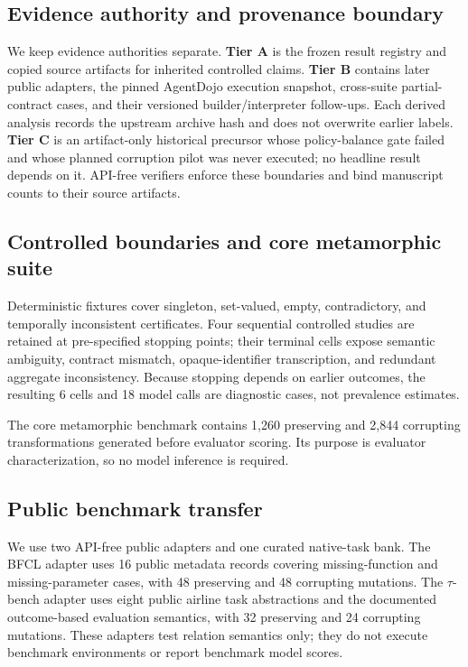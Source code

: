 \subsection{Evidence authority and provenance boundary}
We keep evidence authorities separate. \textbf{Tier A} is the frozen result registry and copied source artifacts for inherited controlled claims. \textbf{Tier B} contains later public adapters, the pinned AgentDojo execution snapshot, cross-suite partial-contract cases, and their versioned builder/interpreter follow-ups. Each derived analysis records the upstream archive hash and does not overwrite earlier labels. \textbf{Tier C} is an artifact-only historical precursor whose policy-balance gate failed and whose planned corruption pilot was never executed; no headline result depends on it. API-free verifiers enforce these boundaries and bind manuscript counts to their source artifacts.

\subsection{Controlled boundaries and core metamorphic suite}
Deterministic fixtures cover singleton, set-valued, empty, contradictory, and temporally inconsistent certificates. Four sequential controlled studies are retained at pre-specified stopping points; their terminal cells expose semantic ambiguity, contract mismatch, opaque-identifier transcription, and redundant aggregate inconsistency. Because stopping depends on earlier outcomes, the resulting 6 cells and 18 model calls are diagnostic cases, not prevalence estimates.

The core metamorphic benchmark contains 1,260 preserving and 2,844 corrupting transformations generated before evaluator scoring. Its purpose is evaluator characterization, so no model inference is required.

\subsection{Public benchmark transfer}
We use two API-free public adapters and one curated native-task bank. The BFCL adapter uses 16 public metadata records covering missing-function and missing-parameter cases, with 48 preserving and 48 corrupting mutations. The $\tau$-bench adapter uses eight public airline task abstractions and the documented outcome-based evaluation semantics, with 32 preserving and 24 corrupting mutations. These adapters test relation semantics only; they do not execute benchmark environments or report benchmark model scores.

